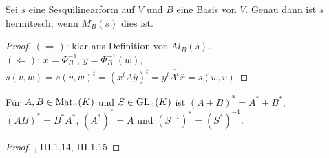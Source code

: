 \begin{proposition}
	Sei $s$ eine Sesquilinearform auf $V$ und $B$ eine Basis von $V$. Genau dann ist $s$ hermitesch, wenn $M_B(s)$ dies ist.
\end{proposition}
\begin{proof}
	$(\Rightarrow)$: klar aus Definition von $M_B(s)$. \\
	$(\Leftarrow)$: $x=\Phi_B^{-1}$, $y=\Phi_B^{-1}(w)$, $\overline{s(v,w)}=\overline{s(v,w)^t}=\overline{(x^tA\overline{y})^t}=y^t\overline{A^t}\overline{x}=s(w,v)$
\end{proof}

\begin{proposition}
	Für $A,B\in\operatorname{Mat}_n(K)$ und $S\in\operatorname{GL}_n(K)$ ist $(A+B)^*=A^*+B^*$, $(AB)^*=B^*A^*$, $(A^*)^*=A$ und $(S^{-1})^*=(S^*)^{-1}$.
\end{proposition}
\begin{proof}
	, III.1.14, III.1.15 %
\end{proof}